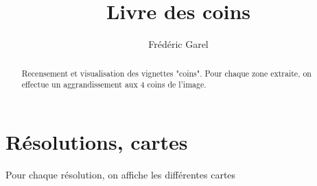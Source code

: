 \documentclass[a4paper, 11pt, utf8]{article}
\title{Livre des coins}       %
\author{Frédéric Garel}
\date{}                       %
\begin{document}
\maketitle                    %

\begin{abstract}              %
  Recensement et visualisation des vignettes "coins".
  Pour chaque zone extraite, on effectue un aggrandissement aux 4 coins de l'image.
\end{abstract}








\clearpage
\section{Résolutions, cartes}                    %
Pour chaque résolution, on affiche les différentes cartes

\clearpage
\end{document}
